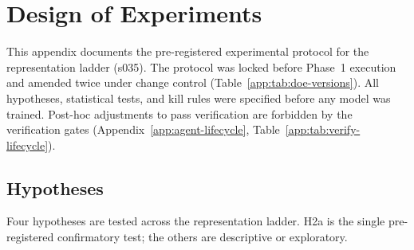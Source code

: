 \section{Design of Experiments}
\label{app:doe}

This appendix documents the pre-registered experimental protocol for the
representation ladder (s035). The protocol was locked before Phase~1
execution and amended twice under change control (Table~\ref{app:tab:doe-versions}).
All hypotheses, statistical tests, and kill rules were specified before
any model was trained. Post-hoc adjustments to pass verification are
forbidden by the verification gates (Appendix~\ref{app:agent-lifecycle},
Table~\ref{app:tab:verify-lifecycle}).

\subsection{Hypotheses}
\label{app:doe-hypotheses}

Four hypotheses are tested across the representation ladder. H2a is the
single pre-registered confirmatory test; the others are descriptive or
exploratory.

